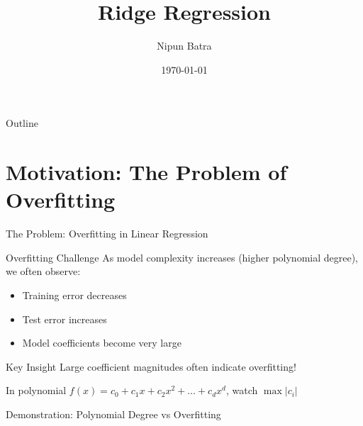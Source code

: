\documentclass{beamer}
\title{Ridge Regression}
\date{\today}
\author{Nipun Batra}
\institute{IIT Gandhinagar}
\begin{document}
  \maketitle

\begin{frame}{Outline}
\tableofcontents
\end{frame}

\section{Motivation: The Problem of Overfitting}

\begin{frame}{The Problem: Overfitting in Linear Regression}
\begin{alertbox}{Overfitting Challenge}
As model complexity increases (higher polynomial degree), we often observe:
\begin{itemize}
\item Training error decreases
\item Test error increases  
\item Model coefficients become very large
\end{itemize}
\end{alertbox}
\pause

\begin{keypointsbox}{Key Insight}
Large coefficient magnitudes often indicate overfitting!
\end{keypointsbox}
\pause

In polynomial $f(x) = c_0 + c_1x + c_2x^2 + \dots + c_dx^d$, watch $\max|c_i|$
\end{frame}
  
\begin{frame}{Demonstration: Polynomial Degree vs Overfitting}
\vspace{0.4cm}
\end{frame}  
\end{document}
